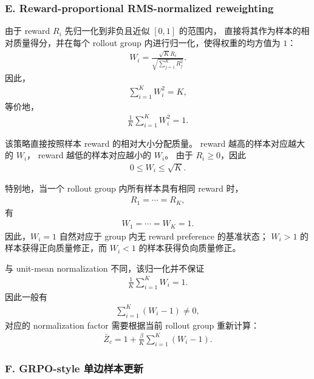 \documentclass[10pt]{article}
\begin{document}
\subsubsection*{E. Reward-proportional RMS-normalized reweighting}

由于 reward $R_i$ 先归一化到非负且近似 $[0,1]$ 的范围内，
直接将其作为样本的相对质量得分，并在每个 rollout group 内进行归一化，使得权重的均方值为 $1$：
\begin{align}
W_i
=
\frac{\sqrt{K}R_i}
{\sqrt{\sum_{j=1}^{K}R_j^2}}.
\end{align}
因此，
\begin{align}
\sum_{i=1}^{K}W_i^2=K,
\end{align}
等价地，
\begin{align}
\frac{1}{K}\sum_{i=1}^{K}W_i^2=1.
\end{align}

该策略直接按照样本 reward 的相对大小分配质量。
reward 越高的样本对应越大的 $W_i$，
reward 越低的样本对应越小的 $W_i$。
由于 $R_i\ge0$，因此
\begin{align}
0\le W_i\le\sqrt{K}.
\end{align}

特别地，当一个 rollout group 内所有样本具有相同 reward 时，
\begin{align}
R_1=\cdots=R_K,
\end{align}
有
\begin{align}
W_1=\cdots=W_K=1.
\end{align}
因此，$W_i=1$ 自然对应于 group 内无 reward preference 的基准状态；
$W_i>1$ 的样本获得正向质量修正，而 $W_i<1$ 的样本获得负向质量修正。

与 unit-mean normalization 不同，该归一化并不保证
\begin{align}
\frac{1}{K}\sum_{i=1}^{K}W_i=1.
\end{align}
因此一般有
\begin{align}
\sum_{i=1}^{K}(W_i-1)\neq0,
\end{align}
对应的 normalization factor 需要根据当前 rollout group 重新计算：
\begin{align}
\bar Z_c
=
1+\frac{\beta}{K}
\sum_{i=1}^{K}(W_i-1).
\end{align}





\subsubsection*{F. GRPO-style 单边样本更新}
\end{document}
